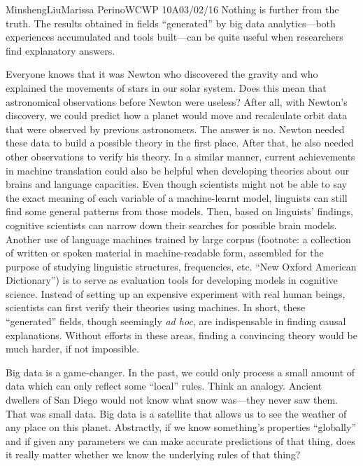 \documentclass[12pt,letterpaper]{article}
\begin{document}
\begin{mla}{Minsheng}{Liu}{Marissa Perino}{WCWP 10A}{03/02/16}
Nothing is further from the truth. The results obtained in fields
``generated'' by big data analytics---both experiences accumulated and
tools built---can be quite useful when researchers find explanatory
answers.

Everyone knows that it was Newton who discovered the gravity and who
explained the movements of stars in our solar system. Does this mean
that astronomical observations before Newton were useless? After all,
with Newton's discovery, we could predict how a planet would move and
recalculate orbit data that were observed by previous astronomers. The
answer is no. Newton needed these data to build a possible theory in the
first place. After that, he also needed other observations to verify his
theory. In a similar manner, current achievements in machine translation
could also be helpful when developing theories about our brains and
language capacities. Even though scientists might not be able to say the
exact meaning of each variable of a machine-learnt model, linguists can
still find some general patterns from those models. Then, based on
linguists' findings, cognitive scientists can narrow down their searches
for possible brain models. Another use of language machines trained by
large corpus (footnote: a collection of written or spoken material in
machine-readable form, assembled for the purpose of studying linguistic
structures, frequencies, etc. ``New Oxford American Dictionary'') is to
serve as evaluation tools for developing models in cognitive science.
Instead of setting up an expensive experiment with real human beings,
scientists can first verify their theories using machines. In short,
these ``generated'' fields, though seemingly \emph{ad hoc}, are
indispensable in finding causal explanations. Without efforts in these
areas, finding a convincing theory would be much harder, if not
impossible.

Big data is a game-changer. In the past, we could only process a small
amount of data which can only reflect some ``local'' rules. Think an
analogy. Ancient dwellers of San Diego would not know what snow
was---they never saw them. That was small data. Big data is a satellite
that allows us to see the weather of any place on this planet.
Abstractly, if we know something's properties ``globally'' and if given
any parameters we can make accurate predictions of that thing, does it
really matter whether we know the underlying rules of that thing?


\end{mla}
\end{document}
